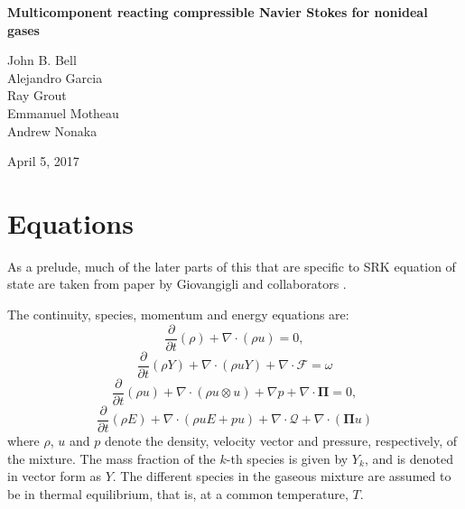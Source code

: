 \documentclass[11pt]{article}
\newcommand{\HeatFlux}{\boldsymbol{\mathcal{Q}}}
\newcommand{\SpeciesFlux}{\boldsymbol{\mathcal{F}}}
\newcommand{\StressTensor}{\boldsymbol{\Pi}}
\begin{document}
\begin{center}
{\bf
Multicomponent reacting compressible Navier Stokes for nonideal gases
}

John B. Bell \\
Alejandro Garcia \\
Ray Grout \\
Emmanuel Motheau \\
Andrew Nonaka

\vspace{\baselineskip}
April 5, 2017
\end{center}

\section{Equations}

As a prelude, much of the later parts of this that are specific to SRK equation of state are taken from 
paper by Giovangigli and collaborators \cite{giovangigli_CTM:2011,giovangigli:2012}.

The continuity, species, momentum and energy equations are:
\begin{equation}
\frac{\partial }{\partial t} \left( \rho \right)  + { \nabla} \cdot \left( \rho { u} \right) = 0,
\label{eqn:cont}
\end{equation}
\begin{equation}
\frac{\partial }{\partial t} \left( \rho Y \right)  + { \nabla} \cdot \left( \rho { u} Y \right) + { \nabla} \cdot
\SpeciesFlux
=  \omega 
\label{eqn:spec}
\end{equation}
\begin{equation}
\frac{\partial }{\partial t} \left( \rho { u} \right)  + { \nabla} \cdot \left( \rho { u \otimes u } \right) + { \nabla} p + {\nabla} \cdot   \StressTensor = 0,
\label{eqn:mom}
\end{equation}
\begin{equation}
\frac{\partial }{\partial t} \left( \rho E \right)  + { \nabla} \cdot \left( \rho { u} E + p { u}  \right) + { \nabla} \cdot  { \HeatFlux}  + \nabla \cdot (\StressTensor u)
\label{eqn:energy}
\end{equation}
where $\rho$, ${u}$ and $p$ denote the density, velocity vector and pressure, respectively, of the mixture.
The mass fraction of the $k$-th species is given by $Y_k$, and is denoted in vector form as $Y$.
The different species in the gaseous mixture are assumed to be in thermal equilibrium,
that is, at a common temperature, $T$.
\end{document}
